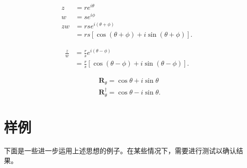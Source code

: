 \begin{tcolorbox}[breakable, enhanced,title = {乘积}]
    $$
        \begin{aligned}
            z   & =r e^{i \theta}                                 \\
            w   & =s e^{i \phi}                                   \\
            z w & =r s e^{i(\theta+\phi)}                         \\
                & =r s[\cos (\theta+\phi)+i \sin (\theta+\phi)] .
        \end{aligned}
    $$
\end{tcolorbox}
\begin{tcolorbox}[breakable, enhanced,title = {商}]
    $$
        \begin{aligned}
            \frac{z}{w} & =\frac{r}{s} e^{i(\theta-\phi)}                         \\
                        & =\frac{r}{s}[\cos (\theta-\phi)+i \sin (\theta-\phi)] .
        \end{aligned}
    $$
\end{tcolorbox}

\begin{tcolorbox}[breakable, enhanced,title = {转子}]
    $$
        \begin{aligned}
             & \mathbf{R}_{\theta}=\cos \theta+i \sin \theta             \\
             & \mathbf{R}_{\theta}^{\dagger}=\cos \theta-i \sin \theta .
        \end{aligned}
    $$
\end{tcolorbox}



\section{样例}
下面是一些进一步运用上述思想的例子。在某些情况下，需要进行测试以确认结果。

